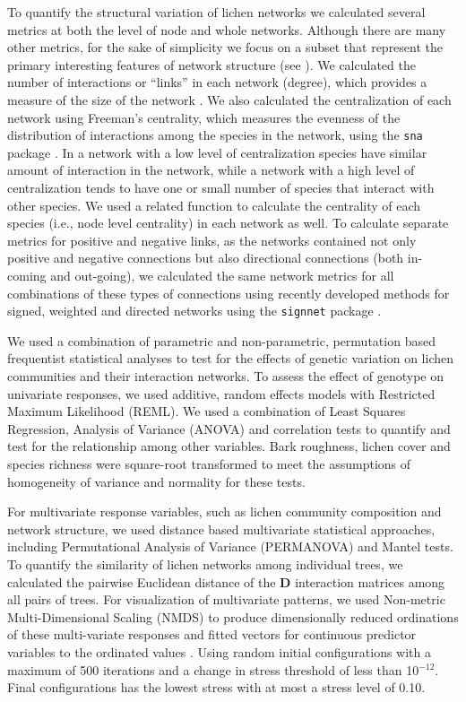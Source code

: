 \documentclass[fleqn,12pt]{olplainarticle}
\begin{document}
To quantify the structural variation of lichen networks we calculated
several metrics at both the level of node and whole networks. Although
there are many other metrics, for the sake of simplicity we focus on a
subset that represent the primary interesting features of network
structure (see \cite{Lau2017a}). We calculated the number of
interactions or ``links'' in each network (degree), which provides a
measure of the size of the network \citep{Lau2015a,
  Borrett2014EnaR:Analysis}. We also calculated the centralization of
each network using Freeman's centrality, which measures the evenness
of the distribution of interactions among the species in the network,
using the \texttt{sna} package \citep{sna}. In a network with a low
level of centralization species have similar amount of interaction in
the network, while a network with a high level of centralization tends
to have one or small number of species that interact with other
species. We used a related function to calculate the centrality of
each species (i.e., node level centrality) in each network as well. To
calculate separate metrics for positive and negative links, as the
networks contained not only positive and negative connections but also
directional connections (both in-coming and out-going), we calculated
the same network metrics for all combinations of these types of
connections using recently developed methods for signed, weighted and
directed networks \citep{Everett2014NetworksTies} using the
\texttt{signnet} package \citep{signnet}.

We used a combination of parametric and non-parametric, permutation
based frequentist statistical analyses to test for the effects of
genetic variation on lichen communities and their interaction
networks. To assess the effect of genotype on univariate responses, we
used additive, random effects models with Restricted Maximum
Likelihood (REML). We used a combination of Least Squares Regression,
Analysis of Variance (ANOVA) and correlation tests to quantify and
test for the relationship among other variables. Bark roughness,
lichen cover and species richness were square-root transformed to meet
the assumptions of homogeneity of variance and normality for these
tests.

For multivariate response variables, such as lichen community
composition and network structure, we used distance based multivariate
statistical approaches, including Permutational Analysis of Variance
(PERMANOVA) and Mantel tests. To quantify the similarity of lichen
networks among individual trees, we calculated the pairwise Euclidean
distance of the $\mathbf{D}$ interaction matrices among all pairs of
trees. For visualization of multivariate patterns, we used Non-metric
Multi-Dimensional Scaling (NMDS) \citep{ecodist} to produce
dimensionally reduced ordinations of these multi-variate responses and
fitted vectors for continuous predictor variables to the ordinated
values \citep{vegan}. Using random initial configurations with a
maximum of 500 iterations and a change in stress threshold of less
than 10$^{-12}$. Final configurations has the lowest stress with at
most a stress level of 0.10.
\end{document}
